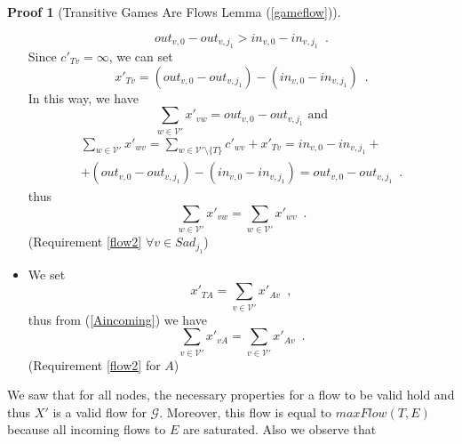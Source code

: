 \documentclass[11pt]{llncs}
\theoremstyle{definition}
\newtheorem{sepproof}{Proof}
\begin{document}
\begin{sepproof}[Transitive Games Are Flows Lemma (\ref{gameflow})]
\begin{itemize}
          \begin{equation*}
             out_{v, 0} - out_{v, j_1} > in_{v, 0} - in_{v, j_1} \enspace.
          \end{equation*}
          Since $c'_{Tv} = \infty$, we can set
          \begin{equation*}
             x'_{Tv} = \left(out_{v, 0} - out_{v, j_1}\right) - \left(in_{v, 0} - in_{v, j_1}\right) \enspace.
          \end{equation*}
          In this way, we have
          \begin{equation*}
             \sum\limits_{w \in \mathcal{V}'}x'_{vw} = out_{v, 0} - out_{v, j_1} \mbox{ and}
          \end{equation*}
          \begin{equation*}
          \begin{gathered}
             \sum\limits_{w \in \mathcal{V}'}x'_{wv} = \sum\limits_{w \in \mathcal{V}' \setminus \{T\}}c'_{wv} + x'_{Tv} =
             in_{v, 0} - in_{v, j_1} + \\ + (out_{v, 0} - out_{v, j_1}) - (in_{v, 0} - in_{v, j_1}) = out_{v, 0} -
             out_{v, j_1} \enspace.
          \end{gathered}
          \end{equation*}
          thus
          \begin{equation*}
             \sum\limits_{w \in \mathcal{V}'}x'_{vw} = \sum\limits_{w \in \mathcal{V}'}x'_{wv} \enspace.
          \end{equation*}
          (Requirement \ref{flow2} $\forall v \in Sad_{j_1}$)
          \item We set
          \begin{equation*}
             x'_{TA} = \sum\limits_{v \in \mathcal{V}'}x'_{Av} \enspace,
          \end{equation*}
          thus from (\ref{Aincoming}) we have
          \begin{equation*}
             \sum\limits_{v \in \mathcal{V}'}x'_{vA} = \sum\limits_{v \in \mathcal{V}'}x'_{Av} \enspace.
          \end{equation*}
          (Requirement \ref{flow2} for $A$)
       \end{itemize}
       We saw that for all nodes, the necessary properties for a flow to be valid hold and thus $X'$ is a valid flow for
       $\mathcal{G}$. Moreover, this flow is equal to $maxFlow(T, E)$ because all incoming flows to $E$ are saturated.
       Also we observe that
       \begin{equation}

\end{equation}
\end{sepproof}
\end{document}
